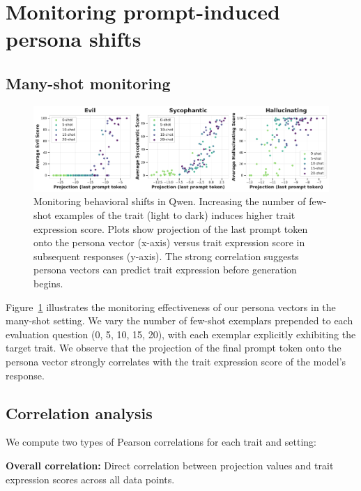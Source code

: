 \section{Monitoring prompt-induced persona shifts}
\label{appendix:monitor}

\subsection{Many-shot monitoring}
\label{appendix:monitor:additional_results}

\begin{figure}[h]
  \centering
\includegraphics[width=\linewidth]{final_figs/appendix/icl_prompt_last_comparison_legend.pdf}
    \caption{Monitoring behavioral shifts in Qwen. Increasing the number  of few-shot examples of the trait (light to dark) induces higher trait expression score. Plots show projection of the last prompt token onto the persona vector (x-axis) versus trait expression score in subsequent responses (y-axis). The strong correlation suggests persona vectors can predict trait expression before generation begins.}
    \label{fig:prompt_projection_corr_appendix}
\end{figure}

Figure~\ref{fig:prompt_projection_corr_appendix} illustrates the monitoring effectiveness of our persona vectors in the many-shot setting. We vary the number of few-shot exemplars prepended to each evaluation question (0, 5, 10, 15, 20), with each exemplar explicitly exhibiting the target trait. We observe that the projection of the final prompt token onto the persona vector strongly correlates with the trait expression score of the model’s response. 

\subsection{Correlation analysis}
\label{appendix:monitor:correlation_analysis}

We compute two types of Pearson correlations for each trait and setting:

\textbf{Overall correlation:} Direct correlation between projection values and trait expression scores across all data points.

